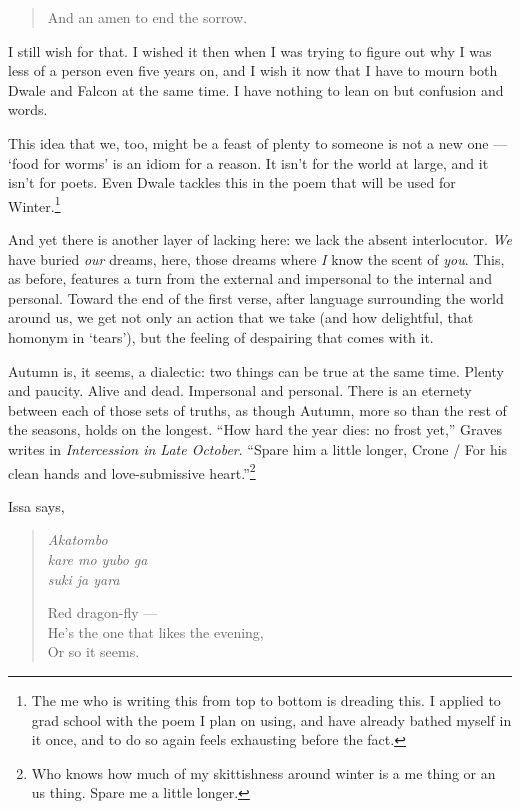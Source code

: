 \documentclass[12pt,oneside]{memoir}
\begin{document}
{\begin{verse}
  And an amen to end the sorrow.
\end{verse}
I still wish for that. I wished it then when I was trying to figure out why I was less of a person even five years on, and I wish it now that I have to mourn both Dwale and Falcon at the same time. I have nothing to lean on but confusion and words.} This idea that we, too, might be a feast of plenty to someone is not a new one --- `food for worms' is an idiom for a reason. It isn't for the world at large, and it isn't for poets. Even Dwale tackles this in the poem that will be used for Winter.\footnote{The me who is writing this from top to bottom is dreading this. I applied to grad school with the poem I plan on using, and have already bathed myself in it once, and to do so again feels exhausting before the fact.}

And yet there is another layer of lacking here: we lack the absent interlocutor. \emph{We} have buried \emph{our} dreams, here, those dreams where \emph{I} know the scent of \emph{you}. This, as before, features a turn from the external and impersonal to the internal and personal. Toward the end of the first verse, after language surrounding the world around us, we get not only an action that we take (and how delightful, that homonym in `tears'), but the feeling of despairing that comes with it.

Autumn is, it seems, a dialectic: two things can be true at the same time. Plenty and paucity. Alive and dead. Impersonal and personal. There is an eternety between each of those sets of truths, as though Autumn, more so than the rest of the seasons, holds on the longest. ``How hard the year dies: no frost yet,'' Graves writes in \emph{Intercession in Late October}. \parencite[23]{graves_intercession} ``Spare him a little longer, Crone / For his clean hands and love-submissive heart.''\footnote{Who knows how much of my skittishness around winter is a me thing or an us thing. Spare me a little longer.} 

Issa says,

\begin{verse}
\emph{Akatombo} \\
\emph{kare mo yubo ga} \\
\emph{suki ja yara}

Red dragon-fly --- \\
He's the one that likes the evening, \\
Or so it seems.

\parencite[65]{issa}
\end{verse}
\end{document}
